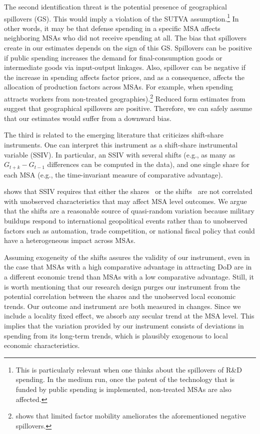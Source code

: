 \documentclass[dv_diss_main.tex]{subfiles}
\begin{document}
The second identification threat is the potential presence of geographical spillovers (GS). This would imply a violation of the SUTVA assumption.\footnote{This is particularly relevant when one thinks about the spillovers of R\&D spending. In the medium run, once the patent of the technology that is funded by public spending is implemented, non-treated MSAs are also affected.} In other words, it may be that defense spending in a specific MSA affects neighboring MSAs who did not receive spending at all. The bias that spillovers create in our estimates depends on the sign of this GS. Spillovers can be positive if public spending increases the demand for final-consumption goods or intermediate goods via input-output linkages. Also, spillover can be negative if the increase in spending affects factor prices, and as a consequence, affects the allocation of production factors across MSAs. For example, when spending attracts workers from non-treated geographies).\footnote{ \cite{chodorow2019geographic} shows that limited factor mobility ameliorates the aforementioned negative spillovers.} Reduced form estimates from \cite{Auerbach2019} suggest that geographical spillovers are positive. Therefore, we can safely assume that our estimates would suffer from a downward bias.

The third is related to the emerging literature that criticizes shift-share instruments\citep{goldsmith2020bartik,borusyak2022quasi,adao2019shift}. One can interpret this instrument as a shift-share instrumental variable (SSIV). In particular, an SSIV with several shifts  (e.g., as many as $G_{t+k}-G_{t-1}$ differences can be computed in the data), and one single share for each MSA (e.g., the time-invariant measure of comparative advantage).

\cite{borusyak2022quasi} shows that SSIV requires that either the shares~\citep{goldsmith2020bartik} or the shifts~\citep{borusyak2022quasi} are not correlated with unobserved characteristics that may affect MSA level outcomes. We argue that the shifts are a reasonable source of quasi-random variation because military buildups respond to international geopolitical events rather than to unobserved factors such as automation, trade competition, or national fiscal policy that could have a heterogeneous impact across MSAs. 

Assuming exogeneity of the shifts assures the validity of our instrument, even in the case that MSAs with a high comparative advantage in attracting DoD are in a different economic trend than MSAs with a low comparative advantage. Still, it is worth mentioning that our research design purges our instrument from the potential correlation between the shares and the unobserved local economic trends. Our outcome and instrument are both measured in changes. Since we include a locality fixed effect, we absorb any secular trend at the MSA level. This implies that the variation provided by our instrument consists of deviations in spending from its long-term trends, which is plausibly exogenous to local economic characteristics.
\end{document}

